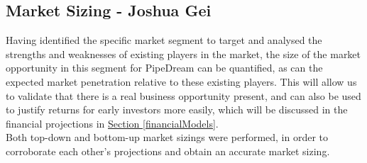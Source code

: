 \documentclass[11pt]{article}		%
\newcommand{\supercite}[1]{\textsuperscript{\cite{#1}}}		%
\newcommand{\sectref}[1]{\hyperref[#1]{Section \ref*{#1}}}     %
\begin{document}
	        
	        
	        
	        
	        
	        
    \subsection[Market Sizing]{Market Sizing - Joshua Gei}\label{marketSizing}
        Having identified the specific market segment to target and analysed the strengths and weaknesses of existing players in the market, the size of the market opportunity in this segment for PipeDream can be quantified, as can the expected market penetration relative to these existing players. This will allow us to validate that there is a real business opportunity present, and can also be used to justify returns for early investors more easily, which will be discussed in the financial projections in \sectref{financialModels}. 
        \\
        \hspace*{2ex}Both top-down and bottom-up market sizings were performed, in order to corroborate each other's projections and obtain an accurate market sizing.  
\end{document}
